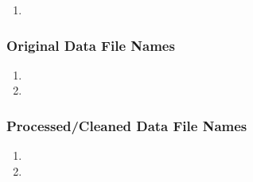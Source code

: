 \begin{enumerate}
\item 
\end{enumerate}

\subsubsection*{Original Data File Names}

\begin{enumerate}
\item 
\item 
\end{enumerate}

\subsubsection*{Processed/Cleaned Data File Names}

\begin{enumerate}
\item 
\item 
\end{enumerate}
